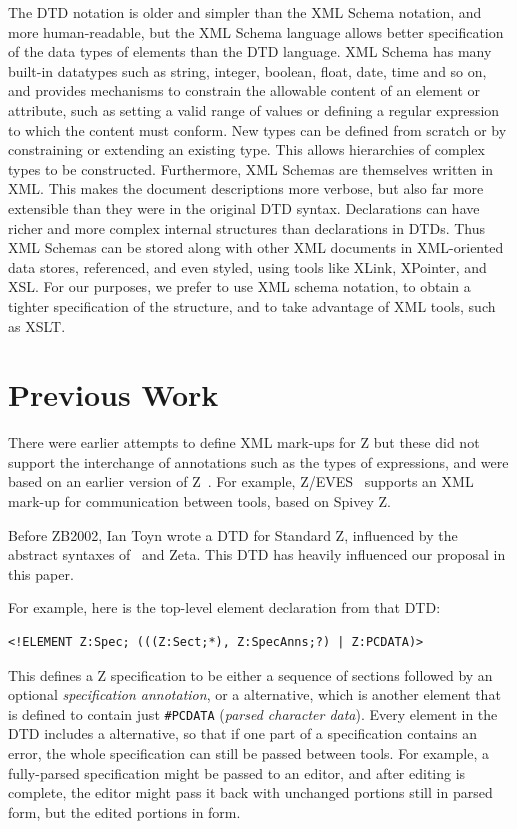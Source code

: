 \documentclass{llncs}  %
\newcommand{\Zeta}{Zeta}
\begin{document}
The DTD notation is older and simpler than the XML Schema notation,
and more human-readable, but 
the XML Schema language allows better specification of the data types
of elements than the DTD language.  XML Schema has many built-in
datatypes such as string, integer, boolean, float, date, time and so
on, and provides mechanisms to constrain the allowable
content of an element or attribute, such as setting a valid range of
values or defining a regular expression to which the content must
conform.  New types can be defined from scratch or by constraining or
extending an existing type.  This allows hierarchies of complex types
to be constructed.  
Furthermore, XML Schemas are themselves written in XML.  This
makes the document descriptions more verbose, but also far more
extensible than they were in the original DTD syntax. Declarations can
have richer and more complex internal structures than declarations in
DTDs. Thus XML Schemas can be stored along with other XML documents in
XML-oriented data stores, referenced, and even styled, using tools
like XLink, XPointer, and XSL. For our purposes, we prefer to use XML
schema notation, to obtain a tighter specification of the structure,
and to take advantage of XML tools, such as XSLT.


\section{Previous Work}

There were earlier attempts to define XML mark-ups for Z
\cite{Wordsworth99,Dong01} but these did not support the interchange of
annotations such as the types of expressions, and were based on an earlier
version of Z~\cite{spivey:z-notation2}. 
For example, Z/EVES~\cite{saaltink:zeves-system} supports an XML mark-up
for communication between tools, based on Spivey Z.

Before ZB2002, Ian Toyn wrote a DTD for Standard Z, influenced by the
abstract syntaxes of \CADiZ\ and \Zeta.  This DTD has heavily influenced our
proposal in this paper. 

For example, here is the top-level element declaration from that DTD:
\begin{small}
\begin{verbatim}
<!ELEMENT Z:Spec; (((Z:Sect;*), Z:SpecAnns;?) | Z:PCDATA)>
\end{verbatim}
\end{small}

This defines a Z specification to be either a sequence of sections
followed by an optional \emph{specification annotation}, or a
 alternative, which is another element that is defined 
to contain just \verb!#PCDATA! (\textit{parsed character data}).
Every element in the DTD includes a  alternative, so
that if one part of a specification contains an error, the whole
specification can still be passed between tools.  For example,
a fully-parsed specification might be passed to an editor, and after
editing is complete, the editor might pass it back with unchanged
portions still in parsed form, but the edited portions in 
form. 
\end{document}
